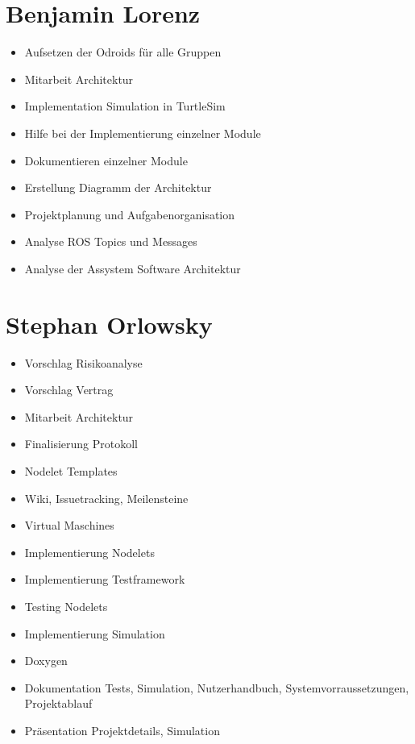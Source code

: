 \documentclass[a4paper, 12pt, titlepage]{scrartcl}
\begin{document}
{	\section{Benjamin Lorenz}
	\begin{itemize}
		\item Aufsetzen der Odroids für alle Gruppen
		\item Mitarbeit Architektur
		\item Implementation Simulation in TurtleSim
		\item Hilfe bei der Implementierung einzelner Module 
		\item Dokumentieren einzelner Module
		\item Erstellung Diagramm der Architektur
		\item Projektplanung und Aufgabenorganisation
		\item Analyse ROS Topics und Messages
		\item Analyse der Assystem Software Architektur		
	\end{itemize}
	\section{Stephan Orlowsky}
	\begin{itemize}
		\item Vorschlag Risikoanalyse
		\item Vorschlag Vertrag
		\item Mitarbeit Architektur
		\item Finalisierung Protokoll
		\item Nodelet Templates
		\item Wiki, Issuetracking, Meilensteine
		\item Virtual Maschines
		\item Implementierung Nodelets
		\item Implementierung Testframework
		\item Testing Nodelets
		\item Implementierung Simulation
		\item Doxygen
		\item Dokumentation Tests, Simulation, Nutzerhandbuch, Systemvorraussetzungen, Projektablauf
		\item Präsentation Projektdetails, Simulation
	\end{itemize}

\newpage
\printbibliography

%
\renewcommand\appendixtocname{Anhang} %
\renewcommand\appendixpagename{Anhang}
\renewcommand\appendixname{Anhang}

}
\end{document}
